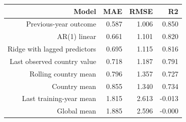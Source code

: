 \begin{tabular}{@{}rrrr@{}}
\toprule
Model & MAE & RMSE & R2 \\
\midrule
Previous-year outcome & 0.587 & 1.006 & 0.850 \\
AR(1) linear & 0.661 & 1.101 & 0.820 \\
Ridge with lagged predictors & 0.695 & 1.115 & 0.816 \\
Last observed country value & 0.718 & 1.187 & 0.791 \\
Rolling country mean & 0.796 & 1.357 & 0.727 \\
Country mean & 0.855 & 1.340 & 0.734 \\
Last training-year mean & 1.815 & 2.613 & -0.013 \\
Global mean & 1.885 & 2.596 & -0.000 \\
\bottomrule
\end{tabular}
